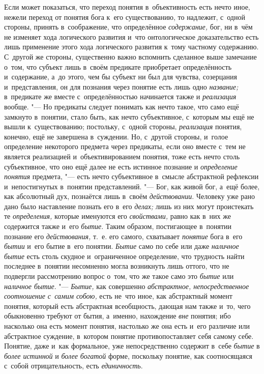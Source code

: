 Если может показаться, что переход понятия в~объективность
есть нечто иное, нежели переход от понятия бога к~его существованию, то
надлежит, с~одной стороны, принять в~соображение, что определённое
{\em содержание,} бог, ни
в~чём не изменяет хода логического развития и~что онтологическое
доказательство есть лишь применение этого хода логического развития к~тому
частному содержанию. С~другой же стороны, существенно важно вспомнить
сделанное выше замечание о~том, что субъект лишь в~своём предикате
приобретает определённость и~содержание, а~до этого, чем бы субъект ни был
для чувства, созерцания и~представления, он для познания через понятие есть
лишь одно {\em название;} в~предикате же вместе с~определённостью начинается
также и {\em реализация} вообще.
"--- Но предикаты следует понимать как нечто такое, что само ещё
замкнуто в~понятии, стало быть, как нечто субъективное, с~которым мы ещё не
вышли к~существованию; постольку, с~одной стороны, {\em реализация} понятия,
конечно, ещё не завершена в~суждении. Но, с~другой стороны, и~голое
определение некоторого предмета через предикаты, если оно вместе с~тем не
является реализацией и~объективированием понятия, тоже есть нечто столь
субъективное, что оно ещё далее не есть истинное познание и
{\em определение понятия} предмета, "--- есть нечто субъективное в~смысле
абстрактной рефлексии и~непостигнутых в~понятии представлений. "---
Бог, как живой бог, а~ещё более, как абсолютный дух,
познаётся лишь в~своём {\em действовании}.
Человеку уже рано дано было наставление познать его в~его
{\em делах;} лишь из них могут проистекать те {\em определения,}
которые именуются его {\em свойствами,} равно
как в~них же содержится также и~его {\em бытие}. Таким
образом, постигающее в~понятии познание его {\em действования,} т.~е.
его самого, схватывает {\em понятие} бога в~его {\em бытии}
и~его бытие в~его понятии. {\em Бытие} само по себе
или даже {\em наличное бытие}
есть столь скудное и~ограниченное определение, что трудность
найти последнее в~понятии несомненно могла возникнуть лишь оттого, что не
подвергли рассмотрению вопрос о~том, что же такое само это
{\em бытие} или {\em наличное бытие}. "--- {\em Бытие,} как
совершенно {\em абстрактное,
непосредственное соотношение с~самим собою,} есть не~что иное,
как абстрактный момент понятия, который есть
абстрактная всеобщность, дающая нам также и~то, чего обыкновенно требуют от
бытия, а~именно, нахождение {\em вне}
понятия; ибо насколько она есть момент понятия, настолько же
она есть и~его различие или абстрактное суждение, в~котором понятие
противопоставляет себя самому себе. Понятие, даже и~как формальное, уже
непосредственно содержит в~себе
{\em бытие} в {\em более истинной} и {\em более богатой}
форме, поскольку понятие, как соотносящаяся с~собой
отрицательность, есть {\em единичность}.

